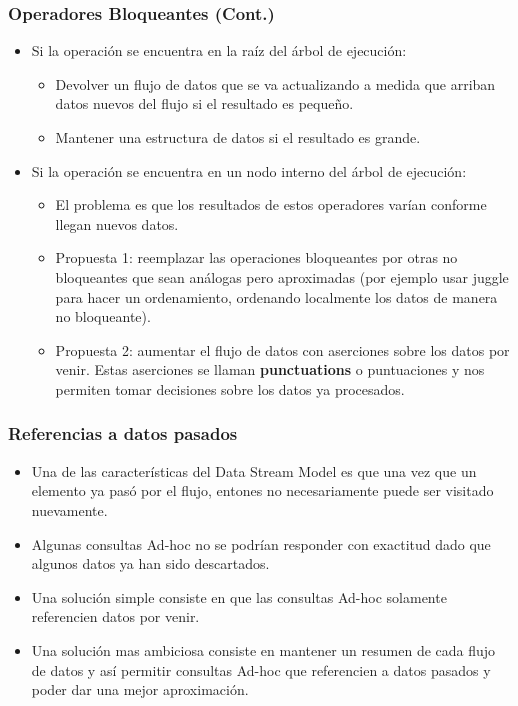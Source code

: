 \begin{frame}
\frametitle{Operadores Bloqueantes (Cont.)}
\begin{itemize}
\item Si la operación se encuentra en la raíz del árbol de ejecución:
\begin{itemize}
\item Devolver un flujo de datos que se va actualizando a medida que arriban datos nuevos del flujo si el resultado es pequeño.
\item Mantener una estructura de datos si el resultado es grande.
\end{itemize}
\item Si la operación se encuentra en un nodo interno del árbol de ejecución:
\begin{itemize}
\item El problema es que los resultados de estos operadores varían conforme llegan nuevos datos.\\
\item Propuesta 1: reemplazar las operaciones bloqueantes por otras no bloqueantes que sean análogas pero aproximadas (por ejemplo usar juggle para hacer un ordenamiento, ordenando localmente los datos de manera no bloqueante).
\item Propuesta 2: aumentar el flujo de datos con aserciones sobre los datos por venir. Estas aserciones se llaman \textbf{punctuations} o puntuaciones y nos permiten tomar decisiones sobre los datos ya procesados.
\end{itemize}
\end{itemize}
\end{frame}

\begin{frame}
\frametitle{Referencias a datos pasados}
\begin{itemize}
\item Una de las características del Data Stream Model es que una vez que un elemento ya pasó por el flujo, entones no necesariamente puede ser visitado nuevamente.
\item Algunas consultas Ad-hoc no se podrían responder con exactitud dado que algunos datos ya han sido descartados.
\item Una solución simple consiste en que las consultas Ad-hoc solamente referencien datos por venir.
\item Una solución mas ambiciosa consiste en mantener un resumen de cada flujo de datos y así permitir consultas Ad-hoc que referencien a datos pasados y poder dar una mejor aproximación.
\end{itemize}
\end{frame}

